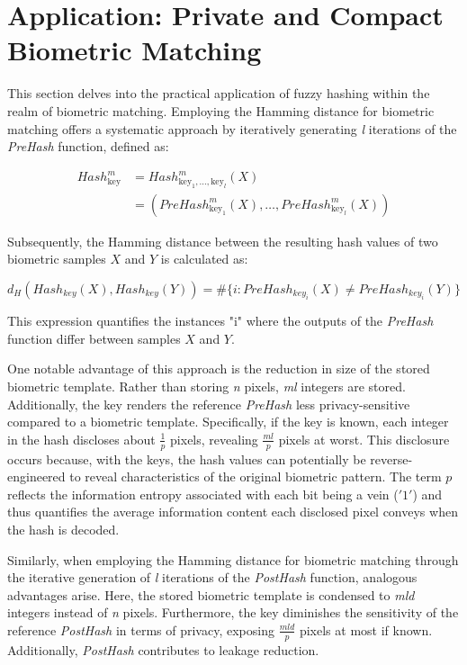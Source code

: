 \newpage
\section{Application: Private and Compact Biometric Matching}
\label{Application: Private and Compact Biometric Matching}

This section delves into the practical application of fuzzy hashing within the realm of biometric matching. Employing the Hamming distance for biometric matching offers a systematic approach by iteratively generating \textit{l} iterations of the \textit{PreHash} function, defined as:

\begin{equation}
    \begin{aligned}
        Hash_{\text{key}}^m &= Hash_{\text{key}_1, \ldots, \text{key}_l}^m(X)\\
        &= (PreHash_{\text{key}_1}^m(X), \ldots, PreHash_{\text{key}_l}^m(X))
    \end{aligned}
\end{equation}

Subsequently, the Hamming distance between the resulting hash values of two biometric samples \(X\) and \(Y\) is calculated as:

\[d_H(Hash_{key}(X), Hash_{key}(Y)) = \# \{i: PreHash_{key_i}(X) \neq PreHash_{key_i}(Y)\}\]

This expression quantifies the instances "i" where the outputs of the \textit{PreHash} function differ between samples \(X\) and \(Y\).

One notable advantage of this approach is the reduction in size of the stored biometric template. Rather than storing \textit{n} pixels, \textit{ml} integers are stored. Additionally, the key renders the reference \textit{PreHash} less privacy-sensitive compared to a biometric template. Specifically, if the key is known, each integer in the hash discloses about \(\frac{1}{p}\) pixels, revealing \(\frac{ml}{p}\) pixels at worst. This disclosure occurs because, with the keys, the hash values can potentially be reverse-engineered to reveal characteristics of the original biometric pattern. The term \(p\)​ reflects the information entropy associated with each bit being a vein (\('1'\)) and thus quantifies the average information content each disclosed pixel conveys when the hash is decoded.

Similarly, when employing the Hamming distance for biometric matching through the iterative generation of \textit{l} iterations of the \textit{PostHash} function, analogous advantages arise. Here, the stored biometric template is condensed to \textit{mld} integers instead of \textit{n} pixels. Furthermore, the key diminishes the sensitivity of the reference \textit{PostHash} in terms of privacy, exposing \(\frac{mld}{p}\) pixels at most if known. Additionally, \textit{PostHash} contributes to leakage reduction.

